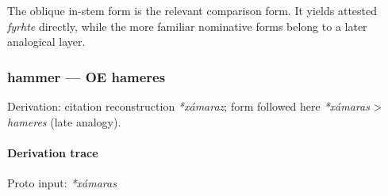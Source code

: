 \documentclass[
  british,
  a4paper,
]{article}
\begin{document}
The oblique in-stem form is the relevant comparison form. It yields
attested \emph{fyrhte} directly, while the more familiar nominative
forms belong to a later analogical layer.

\subsubsection{hammer --- OE hameres}\label{hammer-oe-hameres}

Derivation: citation reconstruction \emph{*xámaraz}; form followed here
\emph{*xámaras} \textgreater{} \emph{hameres} (late analogy).

\paragraph{Derivation trace}\label{derivation-trace-45}

Proto input: \emph{*xámaras}

\begingroup
\setlength{\fboxsep}{6pt}

\noindent{} \endgroup
\end{document}
